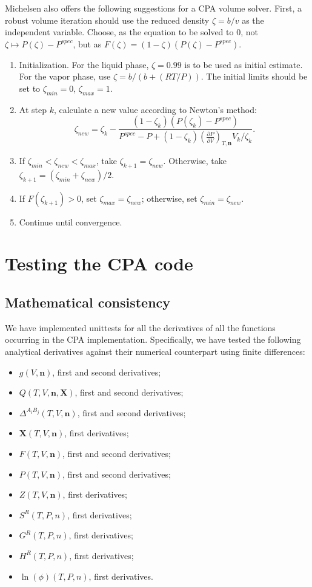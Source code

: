 \documentclass[english]{../thermomemo/thermomemo}
\newcommand{\mbf}[0]{\mathbf}
\newcommand*{\pder}[2]{\left(\frac{\partial #1}{\partial #2}\right)}
\newcommand{\z}{\zeta}
\begin{document}
Michelsen also offers the following suggestions for a CPA volume solver. First, a robust volume iteration should use the reduced density $\zeta = b/v$ as the independent variable. Choose, as the equation to be solved to $0$, not $\zeta \mapsto P(\zeta) - P^{spec}$, but as $F(\z) = (1-\z)(P(\zeta) - P^{spec})$. 
\begin{enumerate}
\item Initialization. For the liquid phase, $\zeta = 0.99$ is to be used as initial estimate. For the vapor phase, use $\zeta = b/(b+(RT/P))$. The initial limits should be set to $\z_{min} = 0$, $\z_{max} = 1$.
\item At step $k$, calculate a new value according to Newton's method:
  \begin{equation}
    \z_{new} = \z_k - \frac{(1-\z_k)(P(\z_k) - P^{spec})}{P^{spec} - P + (1-\z_k)\pder{P}{V}_{T,\mbf n}V_k/\zeta_k}.
  \end{equation}
\item If $\z_{min} < \z_{new} < \z_{max}$, take $\z_{k+1} = \z_{new}$. Otherwise, take $\z_{k+1} = (\z_{min} + \z_{new})/2$.
\item If $F(\z_{k+1}) > 0$, set $\z_{max} = \z_{new}$; otherwise, set $\z_{min} = \z_{new}$.
\item Continue until convergence.
\end{enumerate}

\section{Testing the CPA code}
\subsection{Mathematical consistency}
We have implemented unittests for all the derivatives of all the functions occurring in the CPA implementation. Specifically, we have tested the following analytical derivatives against their numerical counterpart using finite differences:
\begin{itemize}
  \item \(g(V,\mbf n)\), first and second derivatives;
  \item \(Q(T,V,\mbf n, \mbf X)\), first and second derivatives;
  \item \(\Delta^{A_i B_j}(T,V,\mbf n)\), first and second derivatives;
  \item \(\mbf X(T,V,\mbf n)\), first derivatives;
  \item \(F(T,V,\mbf n)\), first and second derivatives;
  \item \(P(T,V,\mbf n)\), first and second derivatives;
  \item \(Z(T,V,\mbf n)\), first derivatives;
  \item \(S^R(T,P,n)\), first derivatives;
  \item \(G^R(T,P,n)\), first derivatives;
  \item \(H^R(T,P,n)\), first derivatives;
  \item \(\ln(\phi)(T,P,n)\), first derivatives.
\end{itemize}
\end{document}
